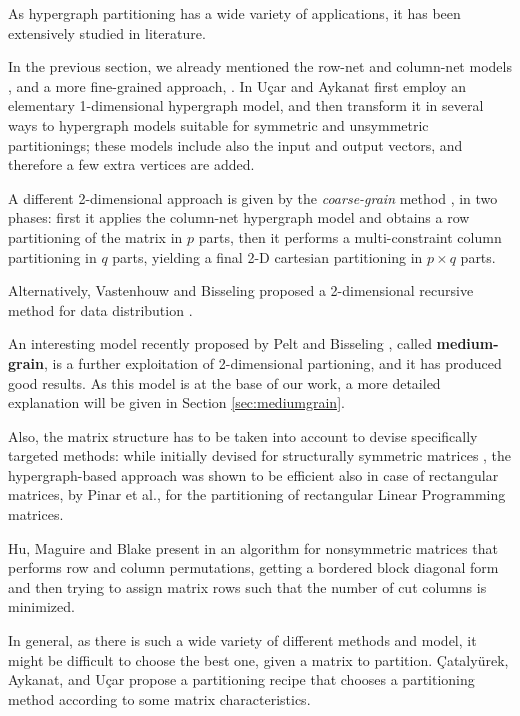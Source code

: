 As hypergraph partitioning has a wide variety of applications, it has been extensively studied in literature.

In the previous section, we already mentioned the row-net and column-net models \cite{hypergraph_model}, and a more fine-grained approach, \cite{hypergraph_finegrain}. In \cite{hypergraph_revisiting} Uçar and Aykanat first employ an elementary 1-dimensional hypergraph model, and then transform it in several ways to hypergraph models suitable for symmetric and unsymmetric partitionings; these models include also the input and output vectors, and therefore a few extra vertices are added.

A different 2-dimensional approach is given by the \emph{coarse-grain} method \cite{hypergraph_coarsegrain}, in two phases: first it applies the column-net hypergraph model and obtains a row partitioning of the matrix in $p$ parts, then it performs  a multi-constraint column partitioning in $q$ parts, yielding a final 2-D cartesian partitioning in $p \times q$ parts. 

Alternatively, Vastenhouw and Bisseling proposed a 2-dimensional recursive method for data distribution \cite{mondriaan}. 

An interesting model recently proposed by Pelt and Bisseling \cite{mediumgrain}, called \textbf{medium-grain}, is a further exploitation of 2-dimensional partioning, and it has produced good results. As this model is at the base of our work, a more detailed explanation will be given in Section \ref{sec:mediumgrain}.

Also, the matrix structure has to be taken into account to devise specifically targeted methods: while initially devised for structurally symmetric matrices \cite{hypergraph_model}, the hypergraph-based approach was shown to be efficient also in case of rectangular matrices, by Pinar et al.\cite{pinar1996}, for the partitioning of rectangular Linear Programming matrices.

Hu, Maguire and Blake present in \cite{hu2000} an algorithm for nonsymmetric matrices that performs row and column permutations, getting a bordered block diagonal form and then trying to assign matrix rows such that the number of cut columns is minimized.

In general, as there is such a wide variety of different methods and model, it might be difficult to choose the best one, given a matrix to partition. {\c{C}}ataly{\"u}rek, Aykanat, and U{\c{c}}ar propose a partitioning recipe \cite{catalyurek_recipe} that chooses a partitioning method according to some matrix characteristics.

